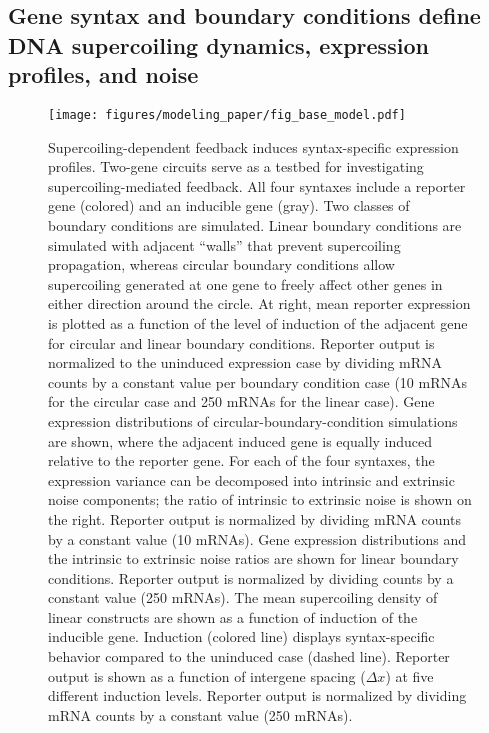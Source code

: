 \documentclass[11pt]{article} %
\begin{document}
\subsection{Gene syntax and boundary conditions define DNA supercoiling dynamics, expression profiles, and noise}
\begin{figure}[ht]
    \centering
    {\texttt{[image: figures/modeling\_paper/fig\_base\_model.pdf]}
    \label{fig:base_orientations}
    \label{fig:bc_induction_sweep}
    \label{fig:circular_bc_distributions}
    \label{fig:linear_bc_distributions}
    \label{fig:base_model_sc_density}
    \label{fig:reporter_output_by_spacing_fold_induction}}
\end{figure}
\begin{figure}
    \ContinuedFloat
    \caption{Supercoiling-dependent feedback induces syntax-specific expression profiles.
         Two-gene circuits serve as a testbed for investigating supercoiling-mediated feedback. All four syntaxes include a reporter gene (colored) and an inducible gene (gray).
         Two classes of boundary conditions are simulated. Linear boundary conditions are simulated with adjacent ``walls'' that prevent supercoiling propagation, whereas circular boundary conditions allow supercoiling generated at one gene to freely affect other genes in either direction around the circle. At right, mean reporter expression is plotted as a function of the level of induction of the adjacent gene for circular and linear boundary conditions. Reporter output is normalized to the uninduced expression case by dividing mRNA counts by a constant value per boundary condition case (10 mRNAs for the circular case and 250 mRNAs for the linear case).
         Gene expression distributions of circular-boundary-condition simulations are shown, where the adjacent induced gene is equally induced relative to the reporter gene. For each of the four syntaxes, the expression variance can be decomposed into intrinsic and extrinsic noise components; the ratio of intrinsic to extrinsic noise is shown on the right. Reporter output is normalized by dividing mRNA counts by a constant value (10 mRNAs).
         Gene expression distributions and the intrinsic to extrinsic noise ratios are shown for linear boundary conditions. Reporter output is normalized by dividing counts by a constant value (250 mRNAs).
         The mean supercoiling density of linear constructs are shown as a function of induction of the inducible gene. Induction (colored line) displays syntax-specific behavior compared to the uninduced case (dashed line).
         Reporter output is shown as a function of intergene spacing (\(\Delta x\)) at five different induction levels. Reporter output is normalized by dividing mRNA counts by a constant value (250 mRNAs).
    } \label{fig:top:orientation_bc_behavior}
\end{figure}
\end{document}
